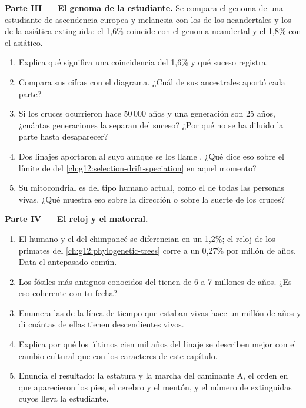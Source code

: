 \begin{problem}
\medskip
\noindent\textbf{Parte III --- El genoma de la estudiante.}
Se compara el genoma de una estudiante de ascendencia europea y
melanesia con los de los neandertales y los de la  asiática
extinguida: el 1,6\% coincide con el genoma neandertal y el 1,8\% con
el asiático.
\begin{enumerate}[resume]
  \item Explica qué significa una coincidencia del 1,6\% y qué suceso
        registra.
  \item Compara sus cifras con el diagrama. ¿Cuál de sus 
        ancestrales aportó cada parte?
  \item Si los cruces ocurrieron hace 50\,000 años y una generación son
        25 años, ¿cuántas generaciones la separan del suceso? ¿Por qué
        no se ha diluido la parte hasta desaparecer?
  \item Dos linajes aportaron  al suyo aunque se los llame
        . ¿Qué dice eso sobre el límite de  del
        \cref{ch:g12:selection-drift-speciation} en aquel momento?
  \item Su  mitocondrial es del tipo humano actual, como el de todas
        las personas vivas. ¿Qué muestra eso sobre la dirección o sobre
        la suerte de los cruces?
\end{enumerate}

\medskip
\noindent\textbf{Parte IV --- El reloj y el matorral.}
\begin{enumerate}[resume]
  \item El  humano y el del chimpancé se diferencian en un 1,2\%; el
        reloj de los primates del \cref{ch:g12:phylogenetic-trees} corre
        a un 0,27\% por millón de años. Data el antepasado común.
  \item Los fósiles más antiguos conocidos del  tienen de
        6 a 7 millones de años. ¿Es eso coherente con tu fecha?
  \item Enumera las  de la línea de tiempo que estaban vivas
        hace un millón de años y di cuántas de ellas tienen
        descendientes vivos.
  \item Explica por qué los últimos cien mil años del linaje se
        describen mejor con el cambio cultural que con los caracteres
        de este capítulo.
  \item Enuncia el resultado: la estatura y la marcha del caminante A,
        el orden en que aparecieron los pies, el cerebro y el mentón, y
        el número de  extinguidas cuyos  lleva la
        estudiante.
\end{enumerate}
\end{problem}
